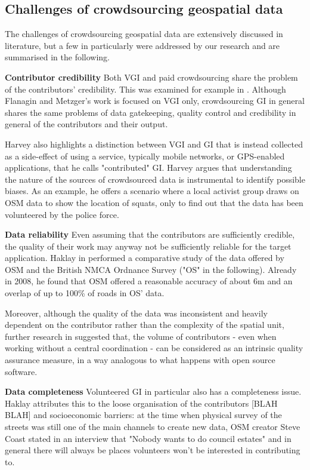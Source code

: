 \subsection{Challenges of crowdsourcing geospatial data}
\label{challenges-of-crowdsourcing-geospatial-data}

The challenges of crowdsourcing geospatial data are extensively discussed in literature, but a few in particularly were addressed by our research and are summarised in the following.

\textbf{Contributor credibility} Both VGI and paid crowdsourcing share the problem of the contributors' credibility. This was examined for example in \cite{Flanagin:2008ck}. Although Flanagin and Metzger's work is focused on VGI only, crowdsourcing GI in general shares the same problems of data gatekeeping, quality control and credibility in general of the contributors and their output. 

Harvey \cite{Harvey:2012wsa} also highlights a distinction between VGI and GI that is instead collected as a side-effect of using a service, typically mobile networks, or GPS-enabled applications, that he calls "contributed" GI. Harvey argues that understanding the nature of the sources of crowdsourced data is instrumental to identify possible biases. As an example, he offers a scenario where a local activist group draws on OSM data to show the location of squats, only to find out that the data has been volunteered by the police force. 

\textbf{Data reliability} Even assuming that the contributors are sufficiently credible, the quality of their work may anyway not be sufficiently reliable for the target application. Haklay in \cite{Haklay:2010vs} performed a comparative study of the data offered by OSM and the British NMCA Ordnance Survey ("OS" in the following). Already in 2008, he found that OSM offered a reasonable accuracy of about 6m and an overlap of up to 100\% of roads in OS' data. 

Moreover, although the quality of the data was inconsistent and heavily dependent on the contributor rather than the complexity of the spatial unit, further research in  \cite{Haklay:2010wf} suggested that, the volume of contributors - even when working without a central coordination - can be considered as an intrinsic quality assurance measure, in a way analogous to what happens with open source software.

\textbf{Data completeness} Volunteered GI in particular also has a completeness issue. Haklay attributes this to the loose organisation of the contributors \cite{Haklay:2010vs} [BLAH BLAH] and socioeconomic barriers: at the time when physical survey of the streets was still one of the main channels to create new data, OSM creator Steve Coast stated in an interview that "Nobody wants to do council estates" \cite{Anonymous:2007ux} and in general there will always be places volunteers won't be interested in contributing to.

